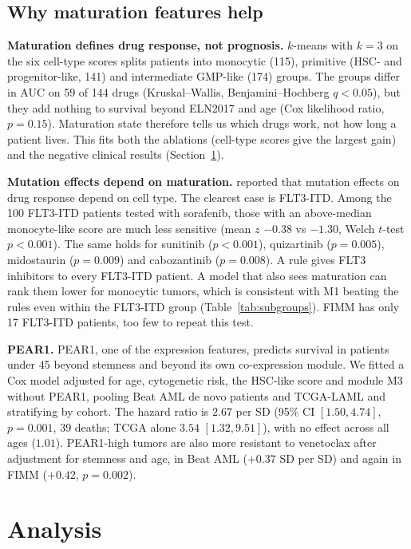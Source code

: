 \documentclass[11pt,logo,nonumbering]{preprint}
\newcommand{\z}{z}
\begin{document}
\subsection{Why maturation features help}
\textbf{Maturation defines drug response, not prognosis.} $k$-means with $k=3$ on the six cell-type scores splits patients into monocytic (115), primitive (HSC- and progenitor-like, 141) and intermediate GMP-like (174) groups. The groups differ in AUC on 59 of 144 drugs (Kruskal--Wallis, Benjamini--Hochberg $q<0.05$), but they add nothing to survival beyond ELN2017 and age (Cox likelihood ratio, $p=0.15$). Maturation state therefore tells us which drugs work, not how long a patient lives. This fits both the ablations (cell-type scores give the largest gain) and the negative clinical results (Section~\ref{sec:analysis}).

\textbf{Mutation effects depend on maturation.} \citet{bottomly2022} reported that mutation effects on drug response depend on cell type. The clearest case is FLT3-ITD. Among the 100 FLT3-ITD patients tested with sorafenib, those with an above-median monocyte-like score are much less sensitive (mean $\z$ $-0.38$ vs $-1.30$, Welch $t$-test $p<0.001$). The same holds for sunitinib ($p<0.001$), quizartinib ($p=0.005$), midostaurin ($p=0.009$) and cabozantinib ($p=0.008$). A rule gives FLT3 inhibitors to every FLT3-ITD patient. A model that also sees maturation can rank them lower for monocytic tumors, which is consistent with M1 beating the rules even within the FLT3-ITD group (Table~\ref{tab:subgroups}). FIMM has only 17 FLT3-ITD patients, too few to repeat this test.

\textbf{PEAR1.} PEAR1, one of the expression features, predicts survival in patients under 45 beyond stemness and beyond its own co-expression module. We fitted a Cox model adjusted for age, cytogenetic risk, the HSC-like score and module M3 without PEAR1, pooling Beat AML de novo patients and TCGA-LAML \citep{tcga2013laml} and stratifying by cohort. The hazard ratio is $2.67$ per SD (95\% CI $[1.50, 4.74]$, $p=0.001$, 39 deaths; TCGA alone $3.54$ $[1.32, 9.51]$), with no effect across all ages ($1.01$). PEAR1-high tumors are also more resistant to venetoclax after adjustment for stemness and age, in Beat AML ($+0.37$ SD per SD) and again in FIMM ($+0.42$, $p=0.002$).

\section{Analysis}
\label{sec:analysis}
\end{document}
